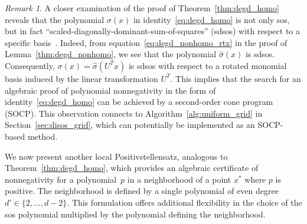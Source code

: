 \documentclass[12pt]{article}
\theoremstyle{remark}
\newtheorem{remark}{Remark}%
\begin{document}
\begin{remark}
A closer examination of the proof of Theorem~\ref{thm:degd_homo} reveals that the polynomial $\sigma(x)$ in identity~\eqref{eq:degd_homo} is not only sos, but in fact ``scaled-diagonally-dominant-sum-of-squares'' (sdsos) with respect to a specific basis~\cite{ahmadi2017sum}. 
Indeed, from equation~\eqref{eq:degd_nonhomo_rtx} in the proof of Lemma~\ref{thm:degd_nonhomo}, we see that the polynomial $\hat{\sigma}(x)$ is sdsos. Consequently, $\sigma(x)=\hat{\sigma}(U^Tx)$ is sdsos with respect to a rotated monomial basis induced by the linear transformation $U^T$. This implies that the search for an algebraic proof of polynomial nonnegativity in the form of identity~\eqref{eq:degd_homo} can be achieved by a second-order cone program (SOCP). This observation connects to Algorithm~\ref{alg:uniform_grid} in Section~\ref{sec:disos_grid}, which can potentially be implemented as an SOCP-based method.
\end{remark}


We now present another local Positivstellensatz, analogous to Theorem~\ref{thm:degd_homo}, which provides an algebraic certificate of nonnegativity for a polynomial~$p$ in a neighborhood of a point $x^*$ where $p$ is positive. The neighborhood is defined by a single polynomial of even degree $d' \in \{2,\ldots,d-2\}$. This formulation offers additional flexibility in the choice of the sos polynomial multiplied by the polynomial defining the neighborhood.


\end{document}
